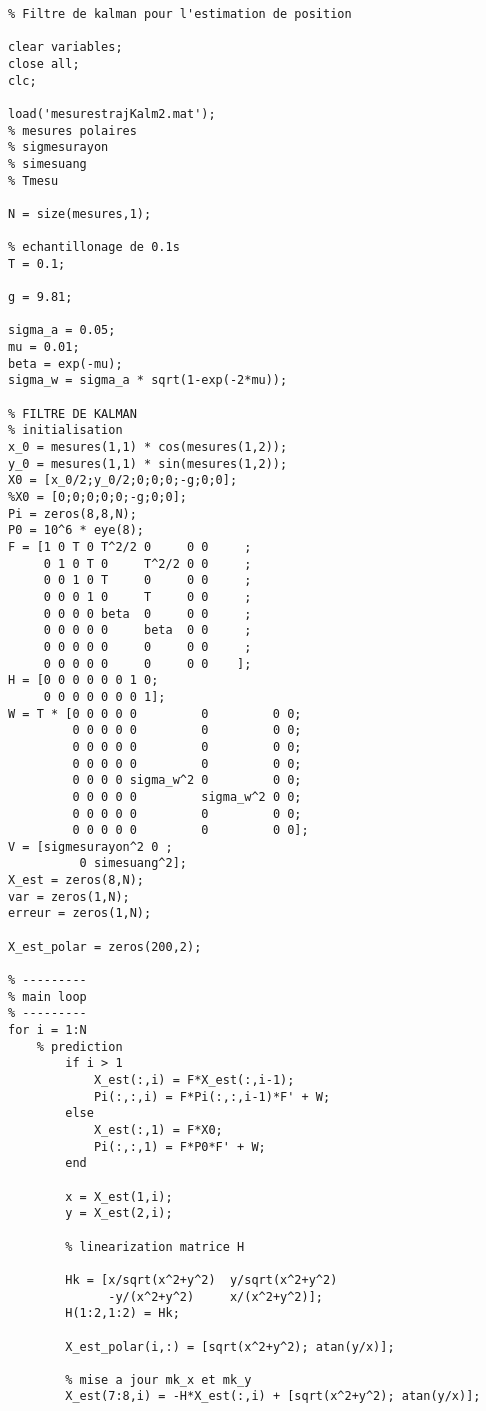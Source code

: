 \begin{verbatim}
% Filtre de kalman pour l'estimation de position

clear variables;
close all;
clc;

load('mesurestrajKalm2.mat');
% mesures polaires
% sigmesurayon
% simesuang
% Tmesu

N = size(mesures,1);

% echantillonage de 0.1s
T = 0.1;

g = 9.81;

sigma_a = 0.05;
mu = 0.01;
beta = exp(-mu);
sigma_w = sigma_a * sqrt(1-exp(-2*mu));

% FILTRE DE KALMAN
% initialisation
x_0 = mesures(1,1) * cos(mesures(1,2));
y_0 = mesures(1,1) * sin(mesures(1,2));
X0 = [x_0/2;y_0/2;0;0;0;-g;0;0];
%X0 = [0;0;0;0;0;-g;0;0];
Pi = zeros(8,8,N);
P0 = 10^6 * eye(8);
F = [1 0 T 0 T^2/2 0     0 0     ;
     0 1 0 T 0     T^2/2 0 0     ;
     0 0 1 0 T     0     0 0     ;
     0 0 0 1 0     T     0 0     ;
     0 0 0 0 beta  0     0 0     ;
     0 0 0 0 0     beta  0 0     ;
     0 0 0 0 0     0     0 0     ;
     0 0 0 0 0     0     0 0    ];
H = [0 0 0 0 0 0 1 0;
     0 0 0 0 0 0 0 1];
W = T * [0 0 0 0 0         0         0 0;
         0 0 0 0 0         0         0 0;
         0 0 0 0 0         0         0 0;
         0 0 0 0 0         0         0 0;
         0 0 0 0 sigma_w^2 0         0 0;
         0 0 0 0 0         sigma_w^2 0 0;
         0 0 0 0 0         0         0 0;
         0 0 0 0 0         0         0 0];
V = [sigmesurayon^2 0 ;
          0 simesuang^2];
X_est = zeros(8,N);
var = zeros(1,N);
erreur = zeros(1,N);

X_est_polar = zeros(200,2);

% ---------
% main loop
% ---------
for i = 1:N
    % prediction
        if i > 1
            X_est(:,i) = F*X_est(:,i-1);
            Pi(:,:,i) = F*Pi(:,:,i-1)*F' + W;
        else
            X_est(:,1) = F*X0;
            Pi(:,:,1) = F*P0*F' + W;
        end

        x = X_est(1,i);
        y = X_est(2,i);

        % linearization matrice H

        Hk = [x/sqrt(x^2+y^2)  y/sqrt(x^2+y^2)
              -y/(x^2+y^2)     x/(x^2+y^2)];
        H(1:2,1:2) = Hk;

        X_est_polar(i,:) = [sqrt(x^2+y^2); atan(y/x)];

        % mise a jour mk_x et mk_y
        X_est(7:8,i) = -H*X_est(:,i) + [sqrt(x^2+y^2); atan(y/x)];


\end{verbatim}
